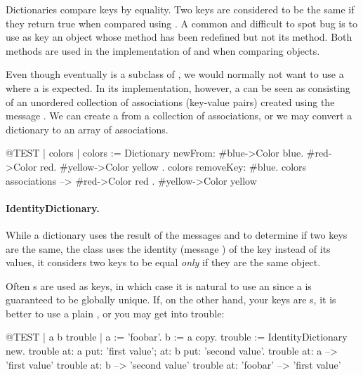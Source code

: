 \documentclass[a4paper,10pt,twoside]{book}
\begin{document}
Dictionaries compare keys by equality.
Two keys are considered to be the same if they return true when compared using \ct{=}.
A common and difficult to spot bug is to use as key an object whose \ct{=} method has been redefined but not its  method.
Both methods are used in the implementation of  and when comparing objects.

Even though  eventually is a subclass of , we would normally not want to use a  where a  is expected.
In its implementation, however, a  can be seen as consisting of an unordered collection of associations (key-value pairs) created using the message .
We can create a  from a collection of associations, or we may convert a dictionary to an array of associations.

\begin{code}{@TEST | colors |}
colors := Dictionary newFrom: { #blue->Color blue. #red->Color red. #yellow->Color yellow }.
colors removeKey: #blue.
colors associations --> {#red->Color red . #yellow->Color yellow}
\end{code}

\paragraph{IdentityDictionary.}
While a dictionary uses the result of the messages \ct{=} and  to determine if two keys are the same, the class  uses the identity (message ) of the key instead of its values, \ie it considers two keys to be equal \emph{only} if they are the same object.

Often s are used as keys, in which case it is natural to use an  since a  is guaranteed to be globally unique.
If, on the other hand, your keys are s, it is better to use a plain , or you may get into trouble:

\begin{code}{@TEST | a b trouble |}
a := 'foobar'.
b := a copy.
trouble := IdentityDictionary new.
trouble 
    at: a put: 'first value'; 
    at: b put: 'second value'.
trouble at: a          --> 'first value'
trouble at: b          --> 'second value'
trouble at: 'foobar' --> 'first value'
\end{code}
\end{document}
